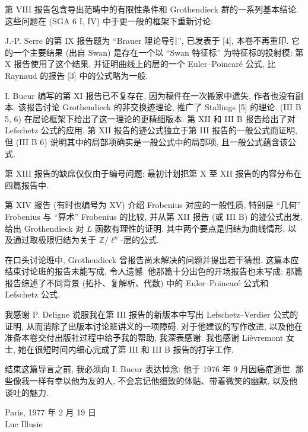 第 VIII 报告包含导出范畴中的有限性条件和 Grothendieck 群的一系列基本结论. 这些问题在 (SGA 6 I, IV) 中于更一般的框架下重新讨论.

J.-P. Serre 的第 IX 报告题为 ``Brauer 理论导引'', 已发表于 [4], 本卷不再重印. 它的一个主要结果 (出自 Swan) 是存在一个以 ``Swan 特征标'' 为特征标的投射模; 第 X 报告使用了这个结果, 并证明曲线上的层的一个 Euler--Poincaré 公式, 比 Raynaud 的报告 [3] 中的公式略为一般.

I. Bucur 编写的第 XI 报告已不复存在, 因为稿件在一次搬家中遗失, 作者也没有副本. 该报告讨论 Grothendieck 的非交换迹理论, 推广了 Stallings [5] 的理论. (III B 5, 6) 在层论框架下给出了这一理论的更精细版本. 第 XII 和 III B 报告给出了对 Lefschetz 公式的应用. 第 XII 报告的迹公式独立于第 III 报告的一般公式而证明, 但 (III B 6) 说明其中的局部项确实是一般公式中的局部项, 且一般公式蕴含该公式.

第 XIII 报告的缺席仅仅由于编号问题: 最初计划把第 X 至 XII 报告的内容分布在四篇报告中.

第 XIV 报告 (有时也编号为 XV) 介绍 Frobenius 对应的一般性质, 特别是 ``几何'' Frobenius 与 ``算术'' Frobenius 的比较, 并从第 XII 报告 (或 III B) 的迹公式出发, 给出 Grothendieck 对 $L$ 函数有理性的证明. 其中两个要点是归结为曲线情形, 以及通过取极限归结为关于 $\mathbb Z/\ell^n$-层的公式.

在口头讨论班中, Grothendieck 曾报告尚未解决的问题并提出若干猜想. 这篇本应结束讨论班的报告未能写成, 令人遗憾. 他那篇十分出色的开场报告也未写成; 那篇报告综述了不同背景 (拓扑、复解析、代数) 中的 Euler--Poincaré 公式和 Lefschetz 公式.

我感谢 P. Deligne 说服我在第 III 报告的新版本中写出 Lefschetz--Verdier 公式的证明, 从而消除了出版本讨论班讲义的一项障碍. 对于他建议的写作改进, 以及他在准备本卷交付出版社过程中给予我的帮助, 我深表感谢. 我也感谢 Lièvremont 女士, 她在很短时间内细心完成了第 III 和 III B 报告的打字工作.

结束这篇导言之前, 我必须向 I. Bucur 表达悼念: 他于 1976 年 9 月因癌症逝世. 那些像我一样有幸以他为友的人, 不会忘记他细致的体贴、带着微笑的幽默, 以及他谈吐的魅力.

\begin{flushright}
Paris, 1977 年 2 月 19 日\\[1em]
Luc Illusie
\end{flushright}

